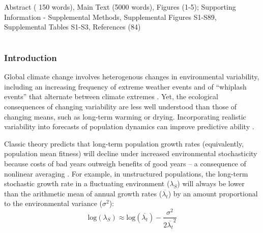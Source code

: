 \documentclass[lineno, sn-basic]{sn-jnl}%
\makeatletter
\def\filecountsname{This file contains}%
\def\filecounts#1{\ifx#1\empty\else\def\@filecounts{\par\addvspace{10pt}{\keywordfont{\bfseries\filecountsname:} #1\par}}\fi}%
\def\@filecounts{}%
\makeatother
\begin{document}
		
		
		\filecounts{Abstract ( 150 words), Main Text (5000 words), Figures (1-5); Supporting Information - Supplemental Methods, Supplemental Figures S1-S89, Supplemental Tables S1-S3, References (84)}
		
		
		
		\maketitle
		



\part{} %

\section*{Introduction}
Global climate change involves heterogenous changes in environmental variability, including an increasing frequency of extreme weather events and of ``whiplash events'' that alternate between climate extremes \citep{seneviratne2012changes, bathiany2018climate,swain2018increasing,ipcc_2021}.
Yet, the ecological consequences of changing variability are less well understood than those of changing means, such as long-term warming or drying. 
Incorporating realistic variability into forecasts of population dynamics can improve predictive ability \citep{clark2005environmental}.

Classic theory predicts that long-term population growth rates (equivalently, population mean fitness) will decline under increased environmental stochasticity because costs of bad years outweigh benefits of good years -- a consequence of nonlinear averaging \citep{lewontin_population_1969,tuljapurkar_population_1982}.
For example, in unstructured populations, the long-term stochastic growth rate in a fluctuating environment ($\lambda_S$) will always be lower than the arithmetic mean of annual growth rates ($\overline{\lambda_{t}}$) by an amount proportional to the environmental variance ($\sigma^2$): 
\begin{equation}
	\mbox{log}(\lambda_S)  \approx \mbox{log}(\overline{\lambda_{t}}) - \frac{\sigma^2}{2\overline{\lambda_{t}}^2}
\end{equation}
\end{document}
